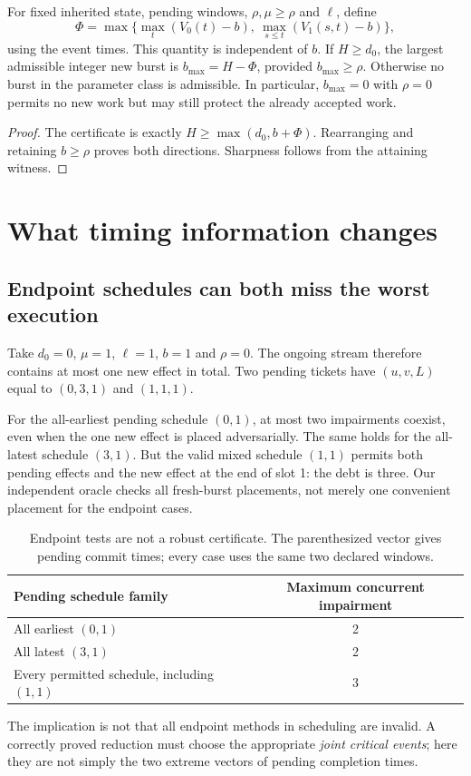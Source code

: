 \begin{corollary}
For fixed inherited state, pending windows, $\rho,\mu\ge\rho$ and $\ell$, define
\[
\Phi=\max\{\max_t(V_0(t)-b),\ \max_{s\le t}(V_1(s,t)-b)\},
\]
using the event times. This quantity is independent of $b$. If $H\ge d_0$, the largest admissible integer new burst is $b_{\max}=H-\Phi$, provided $b_{\max}\ge\rho$. Otherwise no burst in the parameter class is admissible. In particular, $b_{\max}=0$ with $\rho=0$ permits no new work but may still protect the already accepted work.
\end{corollary}
\begin{proof}
The certificate is exactly $H\ge\max(d_0,b+\Phi)$. Rearranging and retaining $b\ge\rho$ proves both directions. Sharpness follows from the attaining witness.
\end{proof}

\section{What timing information changes}
\label{sec:separations}
\subsection{Endpoint schedules can both miss the worst execution}
Take $d_0=0$, $\mu=1$, $\ell=1$, $b=1$ and $\rho=0$. The ongoing stream therefore contains at most one new effect in total. Two pending tickets have $(u,v,L)$ equal to $(0,3,1)$ and $(1,1,1)$.

For the all-earliest pending schedule $(0,1)$, at most two impairments coexist, even when the one new effect is placed adversarially. The same holds for the all-latest schedule $(3,1)$. But the valid mixed schedule $(1,1)$ permits both pending effects and the new effect at the end of slot 1: the debt is three. Our independent oracle checks all fresh-burst placements, not merely one convenient placement for the endpoint cases.

\begin{table}[ht]
\centering\small
\caption{Endpoint tests are not a robust certificate. The parenthesized vector gives pending commit times; every case uses the same two declared windows.}
\begin{tabular}{@{}lc@{}}\toprule
Pending schedule family & Maximum concurrent impairment\\\midrule
All earliest $(0,1)$ &2\\
All latest $(3,1)$ &2\\
Every permitted schedule, including $(1,1)$ &3\\\bottomrule
\end{tabular}
\end{table}
The implication is not that all endpoint methods in scheduling are invalid. A correctly proved reduction must choose the appropriate \emph{joint critical events}; here they are not simply the two extreme vectors of pending completion times.

